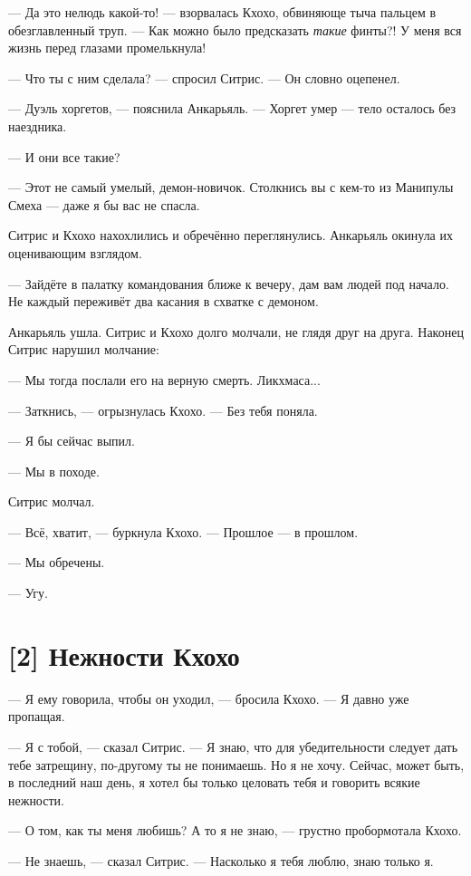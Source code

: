 \documentclass[a4paper,12pt,fleqn]{book}\usepackage{cooltooltips}\usepackage{polyglossia}\setdefaultlanguage[babelshorthands=true]{russian}\setotherlanguage{english}\defaultfontfeatures{Ligatures=TeX,Mapping=tex-text} \usepackage{xcolor}\definecolor{lightgray}{HTML}{bbbbbb}\color{lightgray}\newcommand{\ml}[3]{\textenglish{\textcolor{black}{#3}}}
\begin{document}
{--- Да это нелюдь какой-то! --- взорвалась Кхохо, обвиняюще тыча пальцем в обезглавленный труп.
--- Как можно было предсказать \emph{такие} финты?!
У меня вся жизнь перед глазами промелькнула!

--- Что ты с ним сделала? --- спросил Ситрис.
--- Он словно оцепенел.

--- Дуэль хоргетов, --- пояснила Анкарьяль.
--- Хоргет умер --- тело осталось без наездника.

--- И они все такие?

--- Этот не самый умелый, демон-новичок.
Столкнись вы с кем-то из Манипулы Смеха --- даже я бы вас не спасла.

Ситрис и Кхохо нахохлились и обречённо переглянулись.
Анкарьяль окинула их оценивающим взглядом.

--- Зайдёте в палатку командования ближе к вечеру, дам вам людей под начало.
Не каждый переживёт два касания в схватке с демоном.

Анкарьяль ушла.
Ситрис и Кхохо долго молчали, не глядя друг на друга.
Наконец Ситрис нарушил молчание:

--- Мы тогда послали его на верную смерть.
Ликхмаса...

--- Заткнись, --- огрызнулась Кхохо.
--- Без тебя поняла.

--- Я бы сейчас выпил.

--- Мы в походе.

Ситрис молчал.

--- Всё, хватит, --- буркнула Кхохо.
--- Прошлое --- в прошлом.

--- Мы обречены.

--- Угу.

\section{[2] Нежности Кхохо}

--- Я ему говорила, чтобы он уходил, --- бросила Кхохо.
--- Я давно уже пропащая.

--- Я с тобой, --- сказал Ситрис.
--- Я знаю, что для убедительности следует дать тебе затрещину, по-другому ты не понимаешь.
Но я не хочу.
Сейчас, может быть, в последний наш день, я хотел бы только целовать тебя и говорить всякие нежности.

--- О том, как ты меня любишь?
А то я не знаю, --- грустно пробормотала Кхохо.

--- Не знаешь, --- сказал Ситрис.
--- Насколько я тебя люблю, знаю только я.

}
\end{document}
